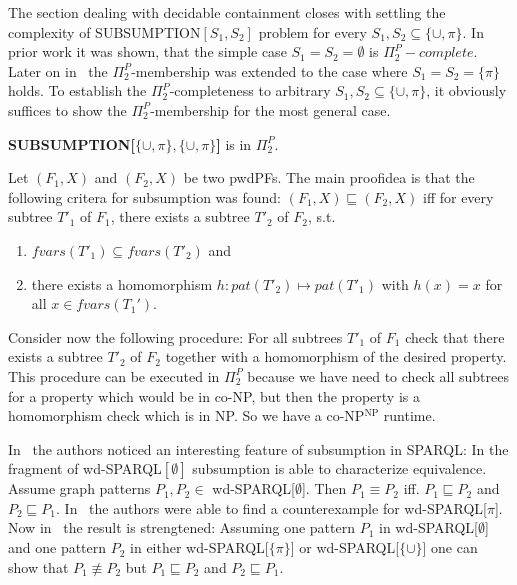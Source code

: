 The section dealing with decidable containment closes with settling the
complexity of SUBSUMPTION$[S_1,S_2]$ problem for every $S_1, S_2 \subseteq \{
\cup, \pi \}$. In prior work \cite{letelier2012static} it was shown, that the simple case
$S_1=S_2=\emptyset$ is $\Pi_2^P-complete$. 
Later on in~\cite{letelier2013static} the $\Pi^P_2$-membership 
was extended to the case where $S_1 = S_2 = \{\pi\}$ holds.
To establish the $\Pi^P_2$-completeness to arbitrary $S_1,S_2 \subseteq \{ \cup,
\pi \}$, it obviously suffices to show the $\Pi_2^P$-membership for the most general case.

\begin{theorem}\label{scuppicuppi}
	\textbf{SUBSUMPTION[$\{\cup,\pi\}, \{ \cup, \pi \}$]} is in $\Pi^P_2$.
\end{theorem}
\begin{proofidea}
	Let $(F_1,X)$ and $(F_2,X)$ be two pwdPFs.
	The main proofidea is that the following critera for subsumption was found:
	$(F_1,X) \sqsubseteq (F_2,X)$ iff for every subtree $T'_1$ of $F_1$, there
	exists a subtree $T'_2$ of $F_2$, s.t.
	\begin{enumerate}
		\item $fvars(T'_1) \subseteq fvars(T'_2)$ and
		\item there exists a homomorphism $h:pat(T'_2) \mapsto pat(T'_1)$
			with $h(x)= x$ for all $x \in fvars(T_1')$.
	\end{enumerate}
	Consider now the following procedure:
	For all subtrees $T'_1$ of $F_1$ check that there exists a subtree $T'_2$ of
	$F_2$ together with a homomorphism of the desired property. This procedure
	can be executed in $\Pi_2^P$ because we have need to check all subtrees
	for a property which would be in co-NP, but then the property is a
	homomorphism check which is in NP. So we have a co-NP$^{\mbox{NP}}$ runtime.
\end{proofidea}

In~\cite{letelier2012static} the authors noticed an interesting feature of
subsumption in SPARQL: In the fragment of wd-SPARQL$[\emptyset]$ subsumption is
able to characterize equivalence. Assume graph patterns $P_1,P_2 \in$
wd-SPARQL[$\emptyset$]. Then $P_1 \equiv P_2$ iff. $P_1 \sqsubseteq P_2$ and 
$P_2 \sqsubseteq P_1$. In~\cite{letelier2013static} the authors were able to
find a counterexample for wd-SPARQL[$\pi$]. 
Now in~\cite{pichler2014containment} the result is strengtened:
Assuming one pattern $P_1$ in wd-SPARQL[$\emptyset$] and one pattern $P_2$ in either
wd-SPARQL[$\{\pi\}$] or wd-SPARQL[$\{\cup\}$] one can show that $P_1 \not\equiv
P_2$ but $P_1 \sqsubseteq P_2$ and $P_2 \sqsubseteq P_1$.

